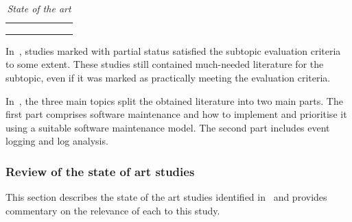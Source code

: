 \begin{table}[!htb]
	\centering
	\caption[State of the art]
	{\textit{State of the art}}
	\label{tbl:ch1_stateOfTheArt2}
	\begin{tabularx}{\textwidth}{cYYYYYY}
		\toprule
		 &  &  &  \\ 
		 \cmidrule(lr){2-4} \cmidrule(lr){5-6} \cmidrule(lr){7-7}
		 & \RaggedRight {} & \RaggedRight {} & \RaggedRight {} &  &  & \RaggedRight {} \\ 		
		\midrule
			\sotaCore
		\bottomrule
	\end{tabularx}	
\end{table}

In~, studies marked with partial status satisfied the subtopic evaluation criteria to some extent. These studies still contained much-needed literature for the subtopic, even if it was marked as practically meeting the evaluation criteria. \par In~, the three main topics split the obtained literature into two main parts. The first part comprises software maintenance and how to implement and prioritise it using a suitable software maintenance model. The second part includes event logging and log analysis. 

\clearpage

\subsubsection{Review of the state of art studies}
This section describes the state of the art studies identified in~ and provides commentary on the relevance of each to this study.



\newcommand{\problemStatement}{Software maintenance is a problem in the industry due to how inefficiently developers prioritise maintenance activities. A proven method to monitor software behaviours is event logging. The logging mechanism and log analysis must be explicitly designed for user-based events to improve software maintenance.}

\clearpage

